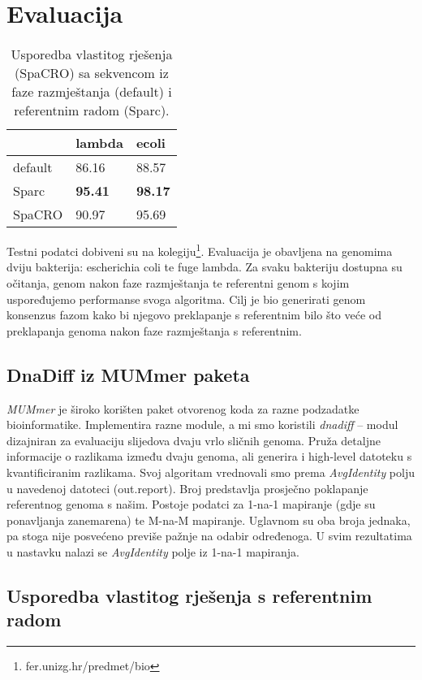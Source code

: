 \chapter{Evaluacija}
\label{sec:eval}

\begin{table}[]
\centering
\caption{Usporedba vlastitog rješenja (SpaCRO) sa sekvencom iz faze razmještanja (default) i referentnim radom (Sparc).}
\label{tbl:usporedba}
\begin{tabular}{l|ll}
  & \multicolumn{1}{l}{lambda} & ecoli \\ \hline
  default & 86.16                       & 88.57 \\
  Sparc   & \textbf{95.41}              & \textbf{98.17} \\
  SpaCRO  & 90.97                       & 95.69
\end{tabular}
\end{table}

Testni podatci dobiveni su na kolegiju\footnote{fer.unizg.hr/predmet/bio}.
Evaluacija je obavljena na genomima dviju bakterija: escherichia coli te fuge lambda.
Za svaku bakteriju dostupna su očitanja, genom nakon faze razmještanja te referentni genom s kojim uspoređujemo performanse svoga algoritma.
Cilj je bio generirati genom konsenzus fazom kako bi njegovo preklapanje s referentnim bilo što veće od preklapanja genoma nakon faze razmještanja s referentnim.

\section{DnaDiff iz MUMmer paketa}

\emph{MUMmer} \citep{kurtz2004versatile} je široko korišten paket otvorenog koda  za razne podzadatke bioinformatike.
Implementira razne module, a mi smo koristili \emph{dnadiff} -- modul dizajniran za evaluaciju slijedova dvaju vrlo sličnih genoma.
Pruža detaljne informacije o razlikama između dvaju genoma, ali generira i high-level datoteku s kvantificiranim razlikama.
Svoj algoritam vrednovali smo prema \emph{AvgIdentity} polju u navedenoj datoteci (out.report).
Broj predstavlja prosječno poklapanje referentnog genoma s našim.
Postoje podatci za 1-na-1 mapiranje (gdje su ponavljanja zanemarena) te M-na-M mapiranje.
Uglavnom su oba broja jednaka, pa stoga nije posvećeno previše pažnje na odabir određenoga.
U svim rezultatima u nastavku nalazi se \emph{AvgIdentity} polje iz 1-na-1 mapiranja.

\section{Usporedba vlastitog rješenja s referentnim radom}

